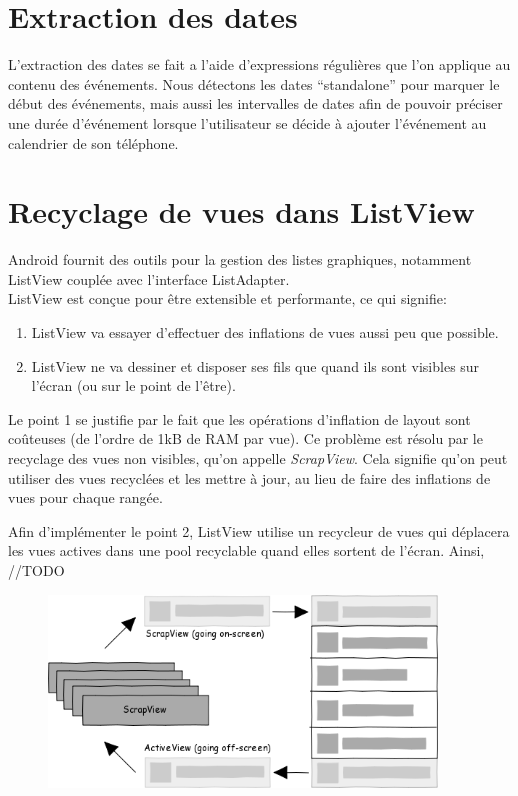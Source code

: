\section{Extraction des dates}
L’extraction des dates se fait a l’aide d’expressions régulières que l’on applique au contenu des événements. Nous détectons les dates “standalone” pour marquer le début des événements, mais aussi les intervalles de dates afin de pouvoir préciser une durée d’événement lorsque l’utilisateur se décide à ajouter l’événement au calendrier de son téléphone.

\section{Recyclage de vues dans ListView}
Android fournit des outils pour la gestion des listes graphiques, notamment ListView couplée avec l’interface ListAdapter.\\
ListView est conçue pour être extensible et performante, ce qui signifie:

\begin{enumerate}
\item ListView va essayer d’effectuer des inflations de vues aussi peu que possible.
\item ListView ne va dessiner et disposer ses fils que quand ils sont visibles sur l’écran (ou sur le point de l'être).
\end{enumerate}

Le point 1 se justifie par le fait que les opérations d’inflation de layout sont coûteuses (de l’ordre de 1kB de RAM par vue). Ce problème est résolu par le recyclage des vues non visibles, qu’on appelle \emph{ScrapView}. Cela signifie qu’on peut utiliser des vues recyclées et les mettre à jour, au lieu de faire des inflations de vues pour chaque rangée.

Afin d’implémenter le point 2, ListView utilise un recycleur de vues qui déplacera les vues actives dans une pool recyclable quand elles sortent de l’écran. Ainsi, //TODO

\begin{figure}[h]
  \center
  \includegraphics[width=0.92\textwidth]{resources/listview_recycling.png}
\end{figure}

